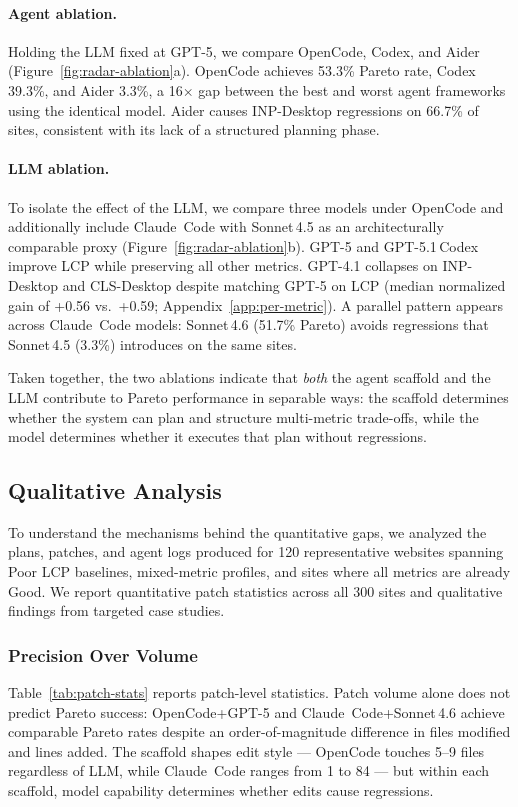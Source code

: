 \paragraph{Agent ablation.}
Holding the LLM fixed at GPT-5, we compare OpenCode, Codex, and Aider (Figure~\ref{fig:radar-ablation}a).
OpenCode achieves 53.3\% Pareto rate, Codex 39.3\%, and Aider 3.3\%, a 16$\times$ gap between the best and worst agent frameworks using the identical model. Aider causes INP-Desktop regressions on 66.7\% of sites, consistent with its lack of a structured planning phase.

\paragraph{LLM ablation.}
To isolate the effect of the LLM, we compare three models under OpenCode and additionally include Claude~Code with Sonnet\,4.5 as an architecturally comparable proxy (Figure~\ref{fig:radar-ablation}b). GPT-5 and GPT-5.1\,Codex improve LCP while preserving all other metrics. GPT-4.1 collapses on INP-Desktop and CLS-Desktop despite matching GPT-5 on LCP (median normalized gain of +0.56 vs.\ +0.59; Appendix~\ref{app:per-metric}). A parallel pattern appears across Claude~Code models: Sonnet\,4.6 (51.7\% Pareto) avoids regressions that Sonnet\,4.5 (3.3\%) introduces on the same sites.

Taken together, the two ablations indicate that \emph{both} the agent scaffold and the LLM contribute to Pareto performance in separable ways: the scaffold determines whether the system can plan and structure multi-metric trade-offs, while the model determines whether it executes that plan without regressions.

\subsection{Qualitative Analysis}
\label{sec:qualitative}

To understand the mechanisms behind the quantitative gaps, we analyzed the plans, patches, and agent logs produced for 120 representative websites spanning Poor LCP baselines, mixed-metric profiles, and sites where all metrics are already Good. We report quantitative patch statistics across all 300 sites and qualitative findings from targeted case studies.

\subsubsection{Precision Over Volume}
Table~\ref{tab:patch-stats} reports patch-level statistics. Patch volume alone does not predict Pareto success: OpenCode+GPT-5 and Claude~Code+Sonnet\,4.6 achieve comparable Pareto rates despite an order-of-magnitude difference in files modified and lines added. The scaffold shapes edit style --- OpenCode touches 5--9 files regardless of LLM, while Claude~Code ranges from 1 to 84 --- but within each scaffold, model capability determines whether edits cause regressions.

